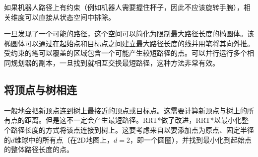 如果机器人路径上有约束（例如机器人需要握住杯子，因此不应该旋转手腕），相关维度可以直接从状态空间中排除。


一旦发现了一个可能的路径，这个空间可以简化为限制最大路径长度的椭圆体。该椭圆体可以通过在起始点和目标点之间建立最大路径长度的线并用笔将其向外推。受约束的笔可以覆盖的区域包含一个可能产生较短路径的点。可以并行运行多个相同规划器的副本，一旦找到就相互交换最短路径，这种方法非常有效\cite{otte2012}。


\subsection{将顶点与树相连}
一般地会把新顶点连到树上最接近的顶点或目标点。这需要计算新顶点与树上的所有点的距离。但是这不一定会产生最短路径。RRT*做了改进，RRT*以最小化整个路径长度的方式将该点连接到树上。这要考虑来自以要添加点为原点、固定半径的$d$维球中的所有点（在2D地图上，$d=2$，即一个圆圈），并找到最小化到起始点的整体路径长度的点。


